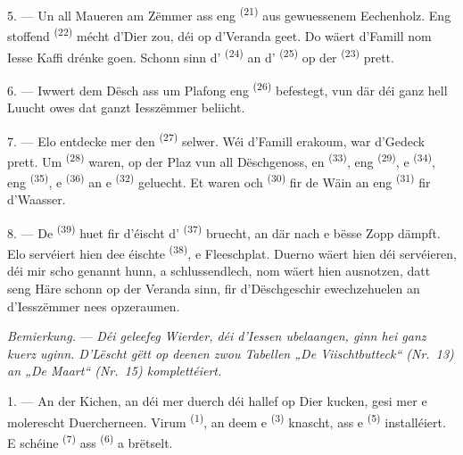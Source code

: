 \VUsaut{4.6mm}
\VUsaut{3.0mm}

5. --- Un all Maueren am Zëmmer ass eng 
\textsuperscript{(21)} aus gewuessenem Eechenholz. Eng stoffend 
\textsuperscript{(22)} mécht d'Dier zou, déi op d'Veranda geet. Do wäert d'Famill nom
Iesse Kaffi drénke goen. Schonn sinn d' \textsuperscript{(24)} an
d' \textsuperscript{(25)} op der 
\textsuperscript{(23)} prett.

6. --- Iwwert dem Dësch ass um Plafong eng 
\textsuperscript{(26)} befestegt, vun där déi ganz hell Luucht owes dat ganzt
Iesszëmmer beliicht.

7. --- Elo entdecke mer den  \textsuperscript{(27)} selwer. Wéi
d'Famill erakoum, war d'Gedeck prett. Um  \textsuperscript{(28)}
waren, op der Plaz vun all Dëschgenoss, en  \textsuperscript{(33)},
eng  \textsuperscript{(29)}, e 
\textsuperscript{(34)}, eng  \textsuperscript{(35)}, e
 \textsuperscript{(36)} an e  \textsuperscript{(32)}
geluecht. Et waren och  \textsuperscript{(30)} fir de Wäin an eng
 \textsuperscript{(31)} fir d'Waasser.

8. --- De  \textsuperscript{(39)} huet fir d'éischt d'
\textsuperscript{(37)} bruecht, an där nach e bësse Zopp dämpft. Elo servéiert hien
dee éischte  \textsuperscript{(38)}, e Fleeschplat. Duerno wäert hien déi
servéieren, déi mir scho genannt hunn, a schlussendlech, nom 
wäert hien ausnotzen, datt seng Häre schonn op der Veranda sinn, fir d'Dëschgeschir
ewechzehuelen an d'Iesszëmmer nees opzeraumen.

\textit{Bemierkung.} --- \textit{Déi geleefeg Wierder, déi d'Iessen ubelaangen, ginn
hei ganz kuerz uginn. D'Lëscht gëtt op deenen zwou Tabellen „De Viischtbutteck“
(Nr.~13) an „De Maart“ (Nr.~15) komplettéiert.}

\VUsaut{4.6mm}
\VUsaut{3.0mm}

1. --- An der Kichen, an déi mer duerch déi hallef op Dier kucken, gesi mer e
molerescht Duercherneen. Virum  \textsuperscript{(1)}, an deem e
 \textsuperscript{(3)} knascht, ass e 
\textsuperscript{(5)} installéiert. E schéine  \textsuperscript{(7)} ass
 \textsuperscript{(6)} a brëtselt.

